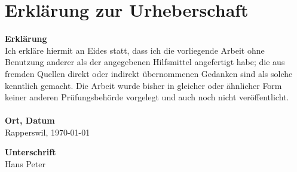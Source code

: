\section{Erklärung zur Urheberschaft}
\vspace{0.8cm}
\textbf{Erklärung}\\

Ich erkläre hiermit an Eides statt, dass ich die vorliegende Arbeit ohne Benutzung anderer als der angegebenen Hilfsmittel angefertigt habe; die aus fremden Quellen direkt oder indirekt übernommenen Gedanken sind als solche kenntlich gemacht. Die Arbeit wurde bisher in gleicher oder ähnlicher Form keiner anderen Prüfungsbehörde vorgelegt und auch noch nicht veröffentlicht.\\
\vspace{0.8cm}\\

\textbf{Ort, Datum}\\
\vspace{0.2cm}
Rapperswil, \today\\
\vspace{0.8cm}

\textbf{Unterschrift}\\
\vspace{0.2cm}
Hans \hspace{3cm} Peter

